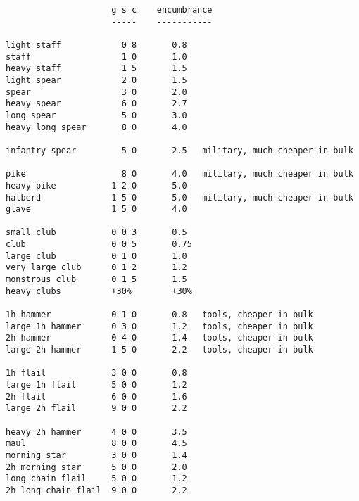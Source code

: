 \small \begin{verbatim}
                     g s c    encumbrance
                     -----    -----------

light staff            0 8       0.8
staff                  1 0       1.0
heavy staff            1 5       1.5
light spear            2 0       1.5
spear                  3 0       2.0
heavy spear            6 0       2.7
long spear             5 0       3.0
heavy long spear       8 0       4.0

infantry spear         5 0       2.5   military, much cheaper in bulk

pike                   8 0       4.0   military, much cheaper in bulk
heavy pike           1 2 0       5.0
halberd              1 5 0       5.0   military, much cheaper in bulk
glave                1 5 0       4.0

small club           0 0 3       0.5
club                 0 0 5       0.75
large club           0 1 0       1.0
very large club      0 1 2       1.2
monstrous club       0 1 5       1.5
heavy clubs          +30%        +30%

1h hammer            0 1 0       0.8   tools, cheaper in bulk
large 1h hammer      0 3 0       1.2   tools, cheaper in bulk
2h hammer            0 4 0       1.4   tools, cheaper in bulk
large 2h hammer      1 5 0       2.2   tools, cheaper in bulk

1h flail             3 0 0       0.8
large 1h flail       5 0 0       1.2
2h flail             6 0 0       1.6
large 2h flail       9 0 0       2.2

heavy 2h hammer      4 0 0       3.5
maul                 8 0 0       4.5
morning star         3 0 0       1.4
2h morning star      5 0 0       2.0
long chain flail     5 0 0       1.2
2h long chain flail  9 0 0       2.2
\end{verbatim} \normalsize
\pagebreak[1]



